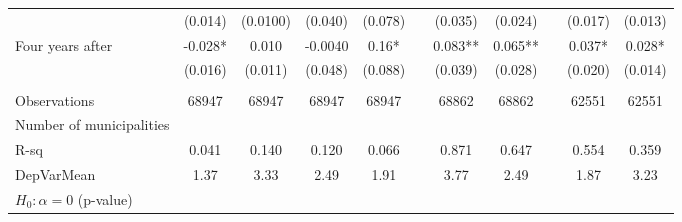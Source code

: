 \begin{tabular}{lcccccccccc}
      & (0.014) & (0.0100) & (0.040) & (0.078) &       & (0.035) & (0.024) &       & (0.017) & (0.013) \\
Four years after & -0.028* & 0.010 & -0.0040 & 0.16* &       & 0.083** & 0.065** &       & 0.037* & 0.028* \\
      & (0.016) & (0.011) & (0.048) & (0.088) &       & (0.039) & (0.028) &       & (0.020) & (0.014) \\
      &       &       &       &       &       &       &       &       &       &  \\
\midrule
Observations & 68947 & 68947 & 68947 & 68947 &       & 68862 & 68862 &       & 62551 & 62551 \\
Number of municipalities &       &       &       &       &       &       &       &       &       &  \\
R-sq  & 0.041 & 0.140 & 0.120 & 0.066 &       & 0.871 & 0.647 &       & 0.554 & 0.359 \\
DepVarMean & 1.37  & 3.33  & 2.49  & 1.91  &       & 3.77  & 2.49  &       & 1.87  & 3.23 \\
$H_0 : \alpha = 0$ (p-value) &       &       &       &       &       &       &       &       &       &  \\
\bottomrule
\bottomrule
\end{tabular}%
